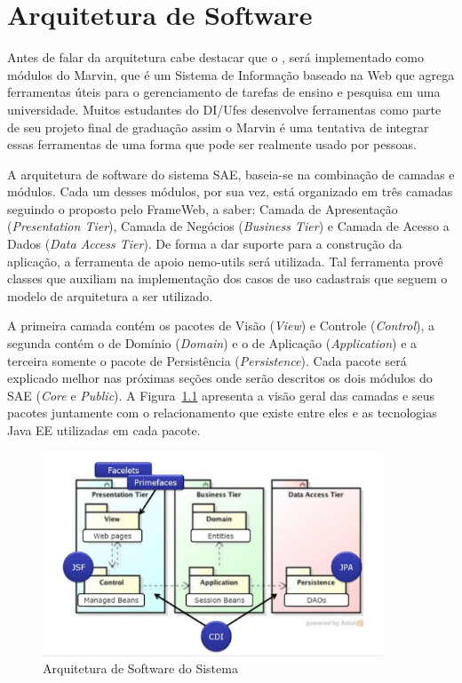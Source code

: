 
\chapter{Arquitetura de Software}
\label{sec-arquitetura}

Antes de falar da arquitetura cabe destacar que o \imprimirtitulo, será implementado como módulos do Marvin, que é  um Sistema de Informação baseado na Web que agrega ferramentas úteis para o gerenciamento de tarefas de ensino e pesquisa em uma universidade.
Muitos estudantes do DI/Ufes desenvolve ferramentas como parte de seu projeto final de graduação assim o Marvin é uma tentativa de integrar essas ferramentas de uma forma que pode ser realmente usado por pessoas.

A arquitetura de software do sistema SAE, baseia-se na combinação de camadas e módulos. Cada um desses módulos, por sua vez, está organizado em três camadas seguindo o proposto pelo FrameWeb, a saber: Camada de Apresentação (\textit{Presentation Tier}), Camada de Negócios (\textit{Business Tier}) e Camada de Acesso a Dados (\textit{Data Access Tier}). De forma a dar suporte para a construção da aplicação, a ferramenta de apoio nemo-utils será utilizada. Tal ferramenta provê classes que auxiliam na implementação dos casos de uso cadastrais que seguem o modelo de arquitetura a ser utilizado.


A primeira camada contém os pacotes de Visão (\textit{View}) e Controle (\textit{Control}), a segunda contém o de Domínio (\textit{Domain}) e o de Aplicação (\textit{Application}) e a terceira somente o pacote de Persistência (\textit{Persistence}). Cada pacote será explicado melhor nas próximas seções onde serão descritos os dois módulos do SAE (\textit{Core} e \textit{Public}). A Figura~\ref{figura-arquitetura} apresenta a visão geral das camadas e seus pacotes juntamente com o relacionamento que existe entre eles e as tecnologias Java EE utilizadas em cada pacote.



\begin{figure}[h]
  \centering
  \includegraphics[width=0.9\textwidth]{figuras/arquitetura.png}
  \caption{Arquitetura de Software do Sistema~\cite{lima-pg15}}
  \label{figura-arquitetura}
\end{figure} 



